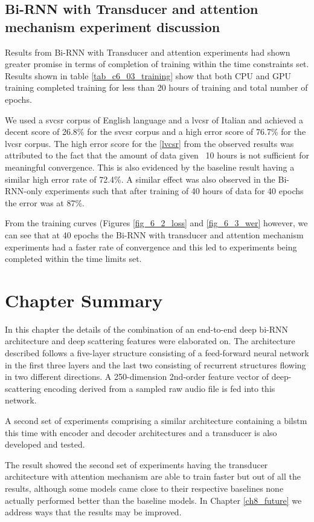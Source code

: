 \subsection{Bi-RNN with Transducer and attention mechanism experiment discussion}
Results from Bi-RNN with Transducer and attention experiments had shown greater promise in terms of completion of training within the time constraints set. Results shown in table \ref{tab_c6_03_training} show that both CPU and GPU training completed training for less than 20 hours of training and total number of epochs.

We used a \acrfull{svcsr} corpus of English language and a \acrfull{lvcsr} of Italian and achieved a decent score of 26.8\% for the \acrshort{svcsr} corpus and a high error score of 76.7\% for the \acrshort{lvcsr} corpus.  The high error score for the \ref{lvcsr} from the observed results was attributed to the fact that the amount of data given ~10 hours is not sufficient for meaningful convergence.  This is also evidenced by the baseline result having a similar high error rate of 72.4\%.  A similar effect was also observed in the Bi-RNN-only experiments such that after training of 40 hours of data for 40 epochs the error was at 87\%.

From the training curves (Figures \ref{fig_6_2_loss} and \ref{fig_6_3_wer} however, we can see that at 40 epochs the Bi-RNN with transducer and attention mechanism experiments had a faster rate of convergence and this led to experiments being completed within the time limits set.

\section{Chapter Summary}

In this chapter the details of the combination of an end-to-end deep bi-RNN architecture and deep scattering features were elaborated on.  The architecture described follows a five-layer structure consisting of a feed-forward neural network in the first three layers and the last two consisting of recurrent structures flowing in two different directions.  A 250-dimension 2nd-order feature vector of deep-scattering encoding derived from a sampled raw audio file is fed into this network.

A second set of experiments comprising a similar architecture containing a \acrshort{bilstm} this time with encoder and decoder architectures and a transducer is also developed and tested.

The result showed the second set of experiments having the transducer architecture with attention mechanism are able to train faster but out of all the results, although some models came close to their respective baselines none actually performed better than the baseline models.  In Chapter \ref{ch8_future} we address ways that the results may be improved.

